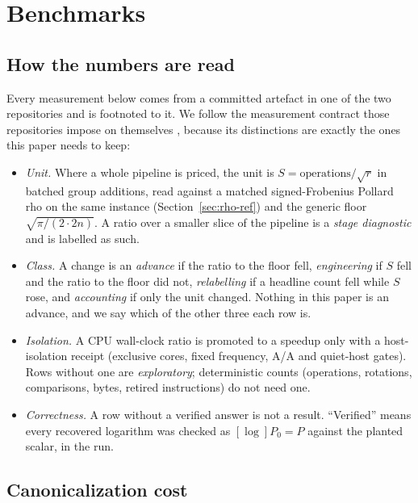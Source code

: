 \section{Benchmarks}
\label{sec:benchmarks}

\subsection{How the numbers are read}
\label{sec:bench-method}

Every measurement below comes from a committed artefact in one of the
two repositories and is footnoted to it. We follow the measurement
contract those repositories impose on themselves
\citep{ecdlpconstant}, because its distinctions are exactly the ones
this paper needs to keep:
\begin{itemize}[leftmargin=1.4em,itemsep=0.2em]
\item \emph{Unit.} Where a whole pipeline is priced, the unit is
  $S=\text{operations}/\sqrt r$ in batched group additions, read
  against a matched signed-Frobenius Pollard rho on the same instance
  (Section~\ref{sec:rho-ref}) and the generic floor
  $\sqrt{\pi/(2\cdot2n)}$. A ratio over a smaller slice of the
  pipeline is a \emph{stage diagnostic} and is labelled as such.
\item \emph{Class.} A change is an \emph{advance} if the ratio to the
  floor fell, \emph{engineering} if $S$ fell and the ratio to the floor
  did not, \emph{relabelling} if a headline count fell while $S$ rose,
  and \emph{accounting} if only the unit changed. Nothing in this paper
  is an advance, and we say which of the other three each row is.
\item \emph{Isolation.} A CPU wall-clock ratio is promoted to a
  speedup only with a host-isolation receipt (exclusive cores, fixed
  frequency, A/A and quiet-host gates). Rows without one are
  \emph{exploratory}; deterministic counts (operations, rotations,
  comparisons, bytes, retired instructions) do not need one.
\item \emph{Correctness.} A row without a verified answer is not a
  result. ``Verified'' means every recovered logarithm was checked as
  $[\log]P_0=P$ against the planted scalar, in the run.
\end{itemize}

\subsection{Canonicalization cost}
\label{sec:bench-canon}

